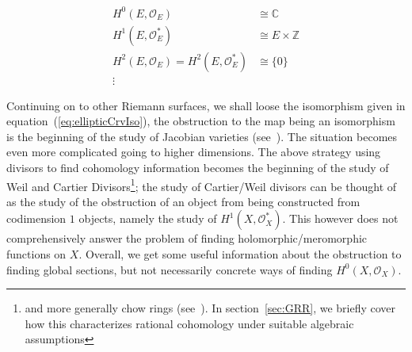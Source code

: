 \documentclass{book}
\newcommand{\Z}{{\mathbb{Z}}}
\newcommand{\C}{{\mathbb{C}}}
\newcommand{\CO}{{\mathcal{O}}}
\begin{document}
\begin{align*}
  H^0(E, \CO_{E}) &\cong \C\\
  H^1(E, \CO_{E}^*) &\cong E\times \Z\\
  H^2(E, \CO_{E}) = H^2(E, \CO_{E}^*)&\cong \{0\}\\
  \vdots
\end{align*}

Continuing on to other Riemann surfaces, we shall loose the isomorphism given in
equation~(\ref{eq:ellipticCrvIso}), the obstruction to the map being an isomorphism is the beginning of the
study of Jacobian varieties (see~\cite[section~6.4]{NateComplexAnalysis}). The situation becomes even more
complicated going to higher dimensions. The above strategy using divisors to find cohomology information
becomes the beginning of the study of Weil and Cartier Divisors\footnote{and more generally chow rings
(see~\cite{NateAlgGeo}). In section~\ref{sec:GRR}, we briefly cover how this characterizes rational cohomology under
suitable algebraic assumptions}; the study of Cartier/Weil divisors can be thought of as the study of the
obstruction of an object from being constructed from codimension $1$ objects, namely the study of $H^1(X,
\CO_X^*)$. This however does not comprehensively answer the problem of finding holomorphic/meromorphic
functions on $X$. Overall, we get some useful information about the obstruction to finding global sections,
but not necessarily concrete ways of finding $H^0(X, \CO_X)$.
\end{document}
